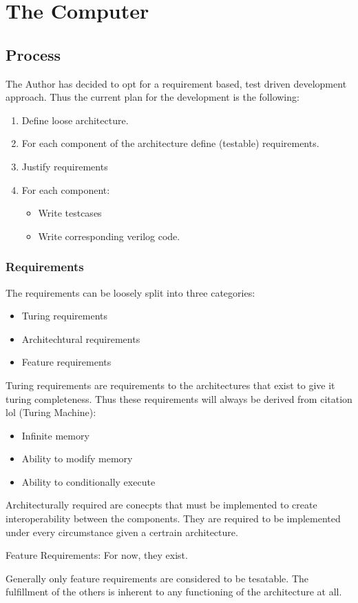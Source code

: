 \chapter{The Computer} %
\label{chap:The Computer}

\section{Process}

The Author has decided to opt for a requirement based, test driven development approach. Thus the current plan for the development is the following:
\begin{enumerate}
  \item Define loose architecture. 
  \item For each component of the architecture define (testable) requirements. 
  \item Justify requirements
  \item For each component:
  \begin{itemize}
    \item Write testcases
    \item Write corresponding verilog code.
  \end{itemize}
\end{enumerate}

\subsection{Requirements}
The requirements can be loosely split into three categories:

\begin{itemize}
  \item Turing requirements
  \item Architechtural requirements
  \item Feature requirements
\end{itemize}


\newtheorem{turing-requirement}{Turing Req.}[subsection]
Turing requirements are requirements to the architectures that exist to give it turing completeness. Thus these requirements will always be derived from citation lol (Turing Machine): 
\begin{itemize}
  \item Infinite memory
  \item Ability to modify memory
  \item Ability to conditionally execute
\end{itemize}

\newtheorem{arch-requirement}{Arch. Req.}[subsection]
Architecturally required are conecpts that must be implemented to create interoperability between the components. They are required to be implemented under every circumstance given a certrain architecture. 

\newtheorem{feat-requirement}{Feat. Req.}[subsection]
Feature Requirements: For now, they exist.


Generally only feature requirements are considered to be tesatable. The fulfillment of the others is inherent to any functioning of the architecture at all. 


